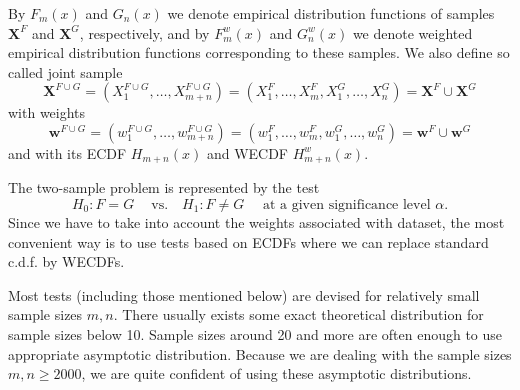 \noindent By $F_m(x) $ and $ G_n(x)$ we  denote empirical distribution functions of samples $\mathbf{X}^F$ and $\mathbf{X}^G$, respectively, and by $F^w_m(x)$ and $ G^w_n(x)$ we denote weighted empirical distribution functions corresponding to these samples. We also define so called joint sample 
\begin{equation}
\mathbf{X}^{F\cup G} = (X^{F\cup G}_1, \ldots, X^{F\cup G}_{m+n}) = (X^{F}_1, \ldots, X^{F}_{m},X^G_1,\ldots, X^G_n) = \mathbf{X}^{F} \cup \mathbf{X}^{G}
\end{equation}
with weights 
\begin{equation}
\mathbf{w}^{F\cup G} = (w^{F\cup G}_1,\ldots, w^{F\cup G}_{m+n}) = (w^{F}_1,\ldots, w^{F}_{m},w^{G}_1,\ldots, w^{G}_{n}) = \mathbf{w}^{F} \cup \mathbf{w}^{G}
\end{equation}
and with its ECDF $H_{m+n}(x)$ and WECDF $H^w_{m+n}(x)$.


\noindent The two-sample problem is represented by the test
\begin{equation}
H_0: F = G \quad\: \text{vs.}\quad H_1: F \neq G \quad\text{ at a given significance level } \alpha.
\end{equation} 
Since we have to take into account the weights associated with dataset, the most convenient way is to use tests based on ECDFs where we can replace standard c.d.f. by WECDFs. 

Most tests (including those mentioned below) are devised for relatively small sample sizes $m,n$. There usually exists some exact theoretical distribution for sample sizes below 10. Sample sizes around 20 and more are often enough to use appropriate asymptotic distribution. Because we are dealing with the sample sizes $m,n \geq 2000$, we are quite confident of using these asymptotic distributions.

